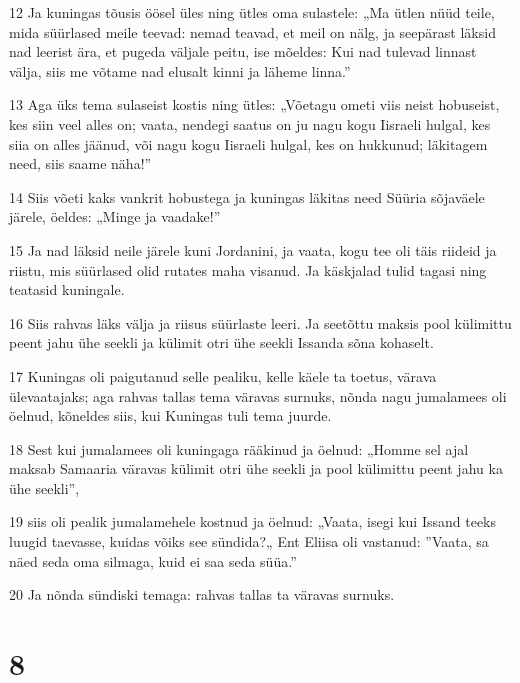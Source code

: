\par 12 Ja kuningas tõusis öösel üles ning ütles oma sulastele: „Ma ütlen nüüd teile, mida süürlased meile teevad: nemad teavad, et meil on nälg, ja seepärast läksid nad leerist ära, et pugeda väljale peitu, ise mõeldes: Kui nad tulevad linnast välja, siis me võtame nad elusalt kinni ja läheme linna.”
\par 13 Aga üks tema sulaseist kostis ning ütles: „Võetagu ometi viis neist hobuseist, kes siin veel alles on; vaata, nendegi saatus on ju nagu kogu Iisraeli hulgal, kes siia on alles jäänud, või nagu kogu Iisraeli hulgal, kes on hukkunud; läkitagem need, siis saame näha!”
\par 14 Siis võeti kaks vankrit hobustega ja kuningas läkitas need Süüria sõjaväele järele, öeldes: „Minge ja vaadake!”
\par 15 Ja nad läksid neile järele kuni Jordanini, ja vaata, kogu tee oli täis riideid ja riistu, mis süürlased olid rutates maha visanud. Ja käskjalad tulid tagasi ning teatasid kuningale.
\par 16 Siis rahvas läks välja ja riisus süürlaste leeri. Ja seetõttu maksis pool külimittu peent jahu ühe seekli ja külimit otri ühe seekli Issanda sõna kohaselt.
\par 17 Kuningas oli paigutanud selle pealiku, kelle käele ta toetus, värava ülevaatajaks; aga rahvas tallas tema väravas surnuks, nõnda nagu jumalamees oli öelnud, kõneldes siis, kui Kuningas tuli tema juurde.
\par 18 Sest kui jumalamees oli kuningaga rääkinud ja öelnud: „Homme sel ajal maksab Samaaria väravas külimit otri ühe seekli ja pool külimittu peent jahu ka ühe seekli”,
\par 19 siis oli pealik jumalamehele kostnud ja öelnud: „Vaata, isegi kui Issand teeks luugid taevasse, kuidas võiks see sündida?„ Ent Eliisa oli vastanud: ”Vaata, sa näed seda oma silmaga, kuid ei saa seda süüa.”
\par 20 Ja nõnda sündiski temaga: rahvas tallas ta väravas surnuks.

\chapter{8}

